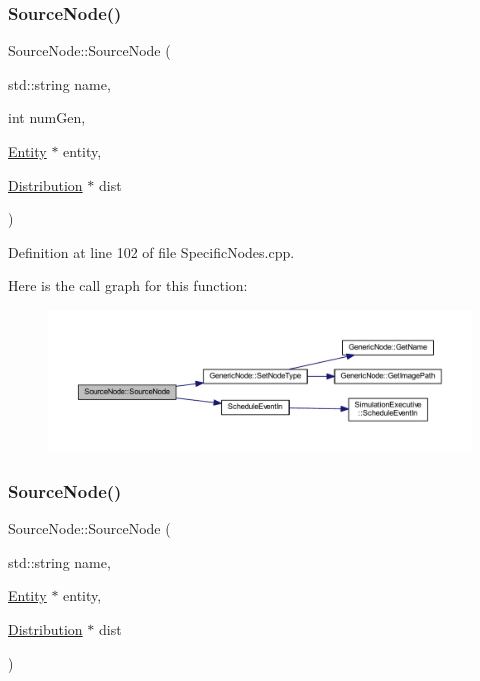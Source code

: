 \subsubsection{\texorpdfstring{Source\+Node()}{SourceNode()}\hspace{0.1cm}{\footnotesize\ttfamily [1/2]}}
{\footnotesize\ttfamily Source\+Node\+::\+Source\+Node (\begin{DoxyParamCaption}\item[{std\+::string}]{name,  }\item[{int}]{num\+Gen,  }\item[{\hyperlink{class_entity}{Entity} $\ast$}]{entity,  }\item[{\hyperlink{class_distribution}{Distribution} $\ast$}]{dist }\end{DoxyParamCaption})}



Definition at line 102 of file Specific\+Nodes.\+cpp.

Here is the call graph for this function\+:
\nopagebreak
\begin{figure}[H]
\begin{center}
\leavevmode
\includegraphics[width=350pt]{class_source_node_aad28db9c905ffdccd8013bc1e4481848_cgraph}
\end{center}
\end{figure}
\mbox{\label{class_source_node_ab287553b2a359c578f4579bd467806a2}} 
\subsubsection{\texorpdfstring{Source\+Node()}{SourceNode()}\hspace{0.1cm}{\footnotesize\ttfamily [2/2]}}
{\footnotesize\ttfamily Source\+Node\+::\+Source\+Node (\begin{DoxyParamCaption}\item[{std\+::string}]{name,  }\item[{\hyperlink{class_entity}{Entity} $\ast$}]{entity,  }\item[{\hyperlink{class_distribution}{Distribution} $\ast$}]{dist }\end{DoxyParamCaption})}



